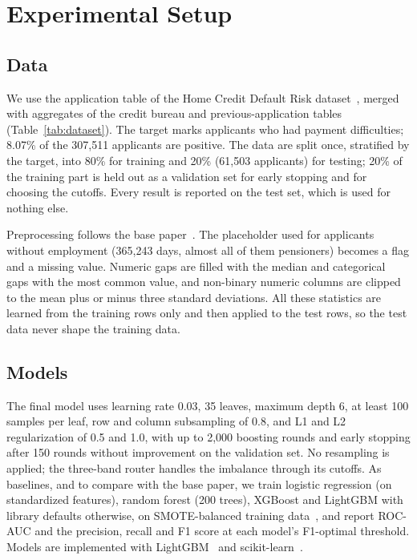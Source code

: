 \section{Experimental Setup}
\label{sec:setup}

\subsection{Data}
We use the application table of the Home Credit Default Risk dataset~\cite{homecredit2018}, merged with aggregates of
the credit bureau and previous-application tables (Table~\ref{tab:dataset}). The target marks applicants who had
payment difficulties; 8.07\% of the 307{,}511 applicants are positive. The data are split once, stratified by the
target, into 80\% for training and 20\% (61{,}503 applicants) for testing; 20\% of the training part is held out as a
validation set for early stopping and for choosing the cutoffs. Every result is reported on the test set, which is used
for nothing else.



Preprocessing follows the base paper~\cite{shreya2025base}. The placeholder used for applicants without employment
(365{,}243 days, almost all of them pensioners) becomes a flag and a missing value. Numeric gaps are filled with the
median and categorical gaps with the most common value, and non-binary numeric columns are clipped to the mean plus or
minus three standard deviations. All these statistics are learned from the training rows only and then applied to the
test rows, so the test data never shape the training data.

\subsection{Models}
The final model uses learning rate 0.03, 35 leaves, maximum depth 6, at least 100 samples per leaf, row and column
subsampling of 0.8, and L1 and L2 regularization of 0.5 and 1.0, with up to 2{,}000 boosting rounds and early stopping
after 150 rounds without improvement on the validation set. No resampling is applied; the three-band router handles the
imbalance through its cutoffs. As baselines, and to compare with the base paper, we train logistic regression (on standardized features), random
forest (200 trees), XGBoost and LightGBM with library defaults otherwise, on SMOTE-balanced training data~\cite{chawla2002smote}, and report
ROC-AUC and the precision, recall and F1 score at each model's F1-optimal threshold. Models are implemented with
LightGBM~\cite{ke2017lightgbm} and scikit-learn~\cite{pedregosa2011sklearn}.

